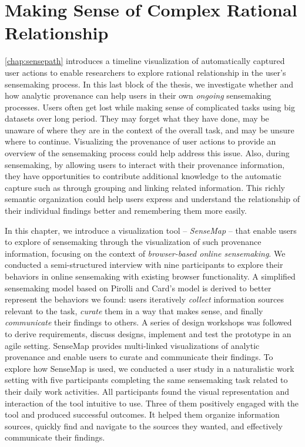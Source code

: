 \chapter{Making Sense of Complex Rational Relationship}
\label{chap:sensemap}

\graphicspath{{Chapter6/figures/}}



\autoref{chap:sensepath} introduces a timeline visualization of automatically captured user actions to enable researchers to explore rational relationship in the user's sensemaking process. In this last block of the thesis, we investigate whether and how analytic provenance can help users in their own \emph{ongoing} sensemaking processes. Users often get lost while making sense of complicated tasks using big datasets over long period. They may forget what they have done, may be unaware of where they are in the context of the overall task, and may be unsure where to continue. Visualizing the provenance of user actions to provide an overview of the sensemaking process could help address this issue. Also, during sensemaking, by allowing users to interact with their provenance information, they have opportunities to contribute additional knowledge to the automatic capture such as through grouping and linking related information. This richly semantic organization could help users express and understand the relationship of their individual findings better and remembering them more easily.

In this chapter, we introduce a visualization tool -- \emph{SenseMap} -- that enable users to explore  of sensemaking through the visualization of such  provenance information, focusing on the context of \emph{browser-based online sensemaking}. We conducted a semi-structured interview with nine participants to explore their behaviors in online sensemaking with existing browser functionality. A simplified sensemaking model based on Pirolli and Card's model is derived to better represent the behaviors we found: users iteratively \emph{collect} information sources relevant to the task, \emph{curate} them in a way that makes sense, and finally \emph{communicate} their findings to others. A series of design workshops was followed to derive requirements, discuss designs, implement and test the prototype in an agile setting. SenseMap provides multi-linked visualizations of analytic provenance and enable users to curate and communicate their findings. To explore how SenseMap is used, we conducted a user study in a naturalistic work setting with five participants completing the same sensemaking task related to their daily work activities. All participants found the visual representation and interaction of the tool intuitive to use. Three of them positively engaged with the tool and produced successful outcomes. It helped them organize information sources, quickly find and navigate to the sources they wanted, and effectively communicate their findings. 





